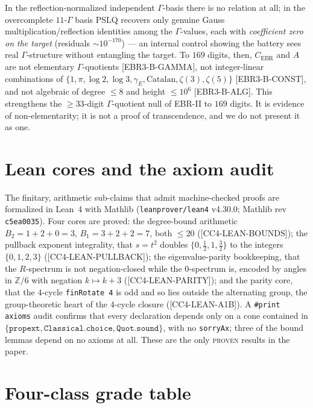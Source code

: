 \documentclass[11pt,reqno]{amsart}
\theoremstyle{plain}
\theoremstyle{definition}
\theoremstyle{remark}
\newcommand{\Z}{\mathbb{Z}}
\newcommand{\Cebr}{C_{\mathrm{EBR}}}
\newcommand{\claim}[1]{\textsf{\small[#1]}}
\begin{document}
In the reflection-normalized independent $\Gamma$-basis there is no relation at
all; in the overcomplete $11$-$\Gamma$ basis PSLQ recovers only genuine Gauss
multiplication/reflection identities among the $\Gamma$-values, each with
\emph{coefficient zero on the target} (residuals $\sim10^{-170}$) --- an
internal control showing the battery sees real $\Gamma$-structure without
entangling the target. To $169$ digits, then, $\Cebr$ and $A$ are not
elementary $\Gamma$-quotients \claim{EBR3-B-GAMMA}, not integer-linear
combinations of $\{1,\pi,\log2,\log3,\gamma_{E},\text{Catalan},\zeta(3),
\zeta(5)\}$ \claim{EBR3-B-CONST}, and not algebraic of degree $\le8$ and height
$\le10^{6}$ \claim{EBR3-B-ALG}. This strengthens the $\ge33$-digit
$\Gamma$-quotient null of EBR-II to $169$ digits. It is evidence of
non-elementarity; it is not a proof of transcendence, and we do not present it
as one.

\section{Lean cores and the axiom audit}\label{sec:lean}

The finitary, arithmetic sub-claims that admit machine-checked proofs are
formalized in Lean~4 with Mathlib (\texttt{leanprover/lean4} v4.30.0; Mathlib
rev \texttt{c5ea0035}). Four cores are proved: the degree-bound arithmetic
$B_{2}=1+2+0=3$, $B_{1}=3+2+2=7$, both $\le20$ (\claim{CC4-LEAN-BOUNDS}); the
pullback exponent integrality, that $s=t^{2}$ doubles
$\{0,\tfrac12,1,\tfrac32\}$ to the integers $\{0,1,2,3\}$
(\claim{CC4-LEAN-PULLBACK}); the eigenvalue-parity bookkeeping, that the
$R$-spectrum is not negation-closed while the $0$-spectrum is, encoded by angles
in $\Z/6$ with negation $k\mapsto k+3$ (\claim{CC4-LEAN-PARITY}); and the parity
core, that the $4$-cycle \texttt{finRotate 4} is odd and so lies outside the
alternating group, the group-theoretic heart of the $4$-cycle closure
(\claim{CC4-LEAN-A1B}). A \verb|#print axioms| audit confirms that every
declaration depends only on a cone contained in
$\{\texttt{propext},\texttt{Classical.choice},\texttt{Quot.sound}\}$, with no
\texttt{sorryAx}; three of the bound lemmas depend on no axioms at all. These
are the only \textsc{proven} results in the paper.

\section{Four-class grade table}\label{sec:gradetable}
\end{document}
